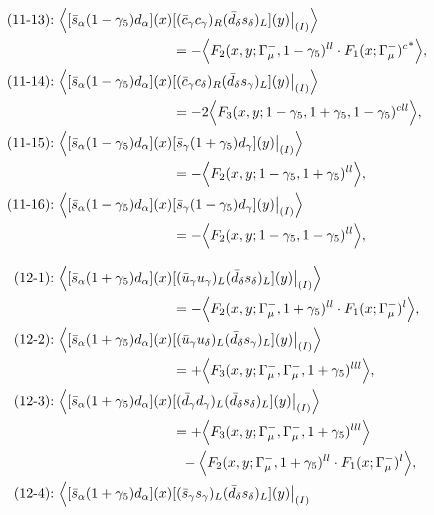 \begin{align}
\\
\mbox{(11-13):}\ 
\Big\langle
[\bar s_\alpha (1 - \gamma_5) d_\alpha](x)&
[(\bar c_\gamma c_\gamma)_R(\bar d_\delta s_\delta)_L](y)\big|_{(I)}
\Big\rangle
\notag\\*
&=
 - \Big\langle F_2(x,y;\Gamma_\mu^-,1-\gamma_5)^{ll} \cdot {F_1(x;\Gamma_\mu^-)^c}^*\Big\rangle,
\\
\mbox{(11-14):}\ 
\Big\langle
[\bar s_\alpha (1 - \gamma_5) d_\alpha](x)&
[(\bar c_\gamma c_\delta)_R(\bar d_\delta s_\gamma)_L](y)\big|_{(I)}
\Big\rangle
\notag\\*
&=
-2\Big\langle F_3(x,y;1-\gamma_5,1+\gamma_5,1-\gamma_5)^{cll}\Big\rangle,
\\
\mbox{(11-15):}\ 
\Big\langle
[\bar s_\alpha (1 - \gamma_5) d_\alpha](x)&
[\bar s_\gamma (1 + \gamma_5) d_\gamma](y)\big|_{(I)}
\Big\rangle
\notag\\*
&=
 - \Big\langle F_2(x,y;1-\gamma_5,1+\gamma_5)^{ll}\Big\rangle,
\\
\mbox{(11-16):}\ 
\Big\langle
[\bar s_\alpha (1 - \gamma_5) d_\alpha](x)&
[\bar s_\gamma (1 - \gamma_5) d_\gamma](y)\big|_{(I)}
\Big\rangle
\notag\\*
&=
 - \Big\langle F_2(x,y;1-\gamma_5,1-\gamma_5)^{ll}\Big\rangle,
\\[3mm]
\mbox{(12-1):}\ 
\Big\langle
[\bar s_\alpha (1 + \gamma_5) d_\alpha](x)&
[(\bar u_\gamma u_\gamma)_L(\bar d_\delta s_\delta)_L](y)\big|_{(I)}
\Big\rangle
\notag\\*
&=
 - \Big\langle F_2(x,y;\Gamma_\mu^-,1+\gamma_5)^{ll} \cdot F_1(x;\Gamma_\mu^-)^l\Big\rangle,
\\
\mbox{(12-2):}\ 
\Big\langle
[\bar s_\alpha (1 + \gamma_5) d_\alpha](x)&
[(\bar u_\gamma u_\delta)_L(\bar d_\delta s_\gamma)_L](y)\big|_{(I)}
\Big\rangle
\notag\\*
&=
 + \Big\langle F_3(x,y;\Gamma_\mu^-,\Gamma_\mu^-,1+\gamma_5)^{lll}\Big\rangle,
\\
\mbox{(12-3):}\ 
\Big\langle
[\bar s_\alpha (1 + \gamma_5) d_\alpha](x)&
[(\bar d_\gamma d_\gamma)_L(\bar d_\delta s_\delta)_L](y)\big|_{(I)}
\Big\rangle
\notag\\*
&=
 + \Big\langle F_3(x,y;\Gamma_\mu^-,\Gamma_\mu^-,1+\gamma_5)^{lll}\Big\rangle
\notag\\*&\ \ 
 - \Big\langle F_2(x,y;\Gamma_\mu^-,1+\gamma_5)^{ll} \cdot F_1(x;\Gamma_\mu^-)^l\Big\rangle,
\\
\mbox{(12-4):}\ 
\Big\langle
[\bar s_\alpha (1 + \gamma_5) d_\alpha](x)&
[(\bar s_\gamma s_\gamma)_L(\bar d_\delta s_\delta)_L](y)\big|_{(I)}

\end{align}
